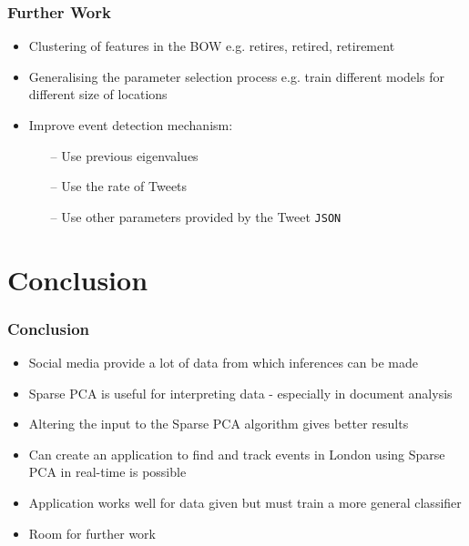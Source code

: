 \documentclass{beamer}
\begin{document}
\begin{frame}
\frametitle{Further Work}
\begin{itemize}
\item Clustering of features in the BOW e.g. retires, retired, retirement
\item Generalising the parameter selection process e.g. train different models for different size of locations
\item Improve event detection mechanism:
	\begin{itemize}
	\item[--] Use previous eigenvalues
	\item[--] Use the rate of Tweets
	\item[--] Use other parameters provided by the Tweet \texttt{JSON}

	\end{itemize}

\end{itemize}
\end{frame}

\section{Conclusion}
\begin{frame}
\frametitle{Conclusion}
\begin{itemize}
\item Social media provide a lot of data from which inferences can be made
\item Sparse PCA is useful for interpreting data - especially in document analysis
\item Altering the input to the Sparse PCA algorithm gives better results
\item Can create an application to find and track events in London using Sparse PCA in real-time is possible
\item Application works well for data given but must train a more general classifier
\item Room for further work

\end{itemize}
\end{frame}
\end{document}
